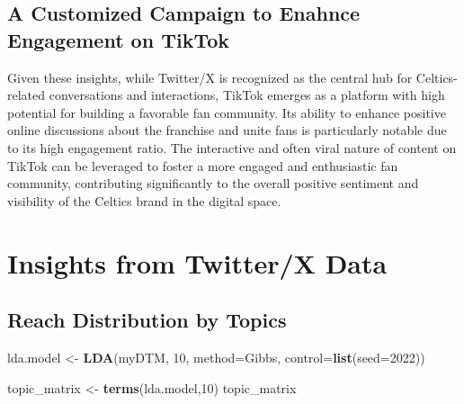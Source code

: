 \documentclass[
]{book}
\newenvironment{Shaded}{\begin{snugshade}}{\end{snugshade}}
\newcommand{\AttributeTok}[1]{\textcolor[rgb]{0.13,0.29,0.53}{#1}}
\newcommand{\DecValTok}[1]{\textcolor[rgb]{0.00,0.00,0.81}{#1}}
\newcommand{\FunctionTok}[1]{\textcolor[rgb]{0.13,0.29,0.53}{\textbf{#1}}}
\newcommand{\NormalTok}[1]{#1}
\newcommand{\OtherTok}[1]{\textcolor[rgb]{0.56,0.35,0.01}{#1}}
\newcommand{\StringTok}[1]{\textcolor[rgb]{0.31,0.60,0.02}{#1}}
\begin{document}
\hypertarget{a-customized-campaign-to-enahnce-engagement-on-tiktok}{%
\subsection{A Customized Campaign to Enahnce Engagement on TikTok}\label{a-customized-campaign-to-enahnce-engagement-on-tiktok}}

Given these insights, while Twitter/X is recognized as the central hub for Celtics-related conversations and interactions, TikTok emerges as a platform with high potential for building a favorable fan community. Its ability to enhance positive online discussions about the franchise and unite fans is particularly notable due to its high engagement ratio. The interactive and often viral nature of content on TikTok can be leveraged to foster a more engaged and enthusiastic fan community, contributing significantly to the overall positive sentiment and visibility of the Celtics brand in the digital space.

\hypertarget{insights-from-twitterx-data}{%
\section{Insights from Twitter/X Data}\label{insights-from-twitterx-data}}

\hypertarget{reach-distribution-by-topics}{%
\subsection{Reach Distribution by Topics}\label{reach-distribution-by-topics}}

\begin{Shaded}
\begin{Highlighting}[]
\NormalTok{lda.model }\OtherTok{\textless{}{-}} \FunctionTok{LDA}\NormalTok{(myDTM, }\DecValTok{10}\NormalTok{, }\AttributeTok{method=}\StringTok{\textquotesingle{}Gibbs\textquotesingle{}}\NormalTok{, }\AttributeTok{control=}\FunctionTok{list}\NormalTok{(}\AttributeTok{seed=}\DecValTok{2022}\NormalTok{))}

\NormalTok{topic\_matrix }\OtherTok{\textless{}{-}} \FunctionTok{terms}\NormalTok{(lda.model,}\DecValTok{10}\NormalTok{) }
\NormalTok{topic\_matrix}
\end{Highlighting}
\end{Shaded}
\end{document}
